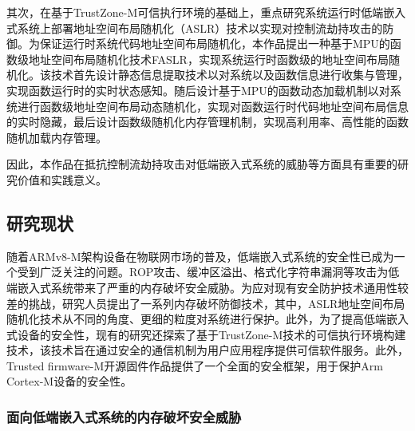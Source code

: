 \documentclass[UTF8,12pt,a4paper,twoside]{ctexart}
\numberwithin{figure}{section}
\begin{document}
\par 其次，在基于TrustZone-M可信执行环境的基础上，重点研究系统运行时低端嵌入式系统上部署地址空间布局随机化（ASLR）技术以实现对控制流劫持攻击的防御。为保证运行时系统代码地址空间布局随机化，本作品提出一种基于MPU的函数级地址空间布局随机化技术FASLR，实现系统运行时函数级的地址空间布局随机化。该技术首先设计静态信息提取技术以对系统以及函数信息进行收集与管理，实现函数运行时的实时状态感知。随后设计基于MPU的函数动态加载机制以对系统进行函数级地址空间布局动态随机化，实现对函数运行时代码地址空间布局信息的实时隐藏，最后设计函数级随机化内存管理机制，实现高利用率、高性能的函数随机加载内存管理。

\par 因此，本作品在抵抗控制流劫持攻击对低端嵌入式系统的威胁等方面具有重要的研究价值和实践意义。


\subsection{研究现状}
\par 随着ARMv8-M架构设备在物联网市场的普及，低端嵌入式系统的安全性已成为一个受到广泛关注的问题。ROP攻击、缓冲区溢出、格式化字符串漏洞等攻击为低端嵌入式系统带来了严重的内存破坏安全威胁。为应对现有安全防护技术通用性较差的挑战，研究人员提出了一系列内存破坏防御技术，其中，ASLR地址空间布局随机化技术从不同的角度、更细的粒度对系统进行保护。此外，为了提高低端嵌入式设备的安全性，现有的研究还探索了基于TrustZone-M技术的可信执行环境构建技术，该技术旨在通过安全的通信机制为用户应用程序提供可信软件服务。此外，Trusted firmware-M开源固件作品提供了一个全面的安全框架，用于保护Arm Cortex-M设备的安全性。

\subsubsection{面向低端嵌入式系统的内存破坏安全威胁}
\end{document}
